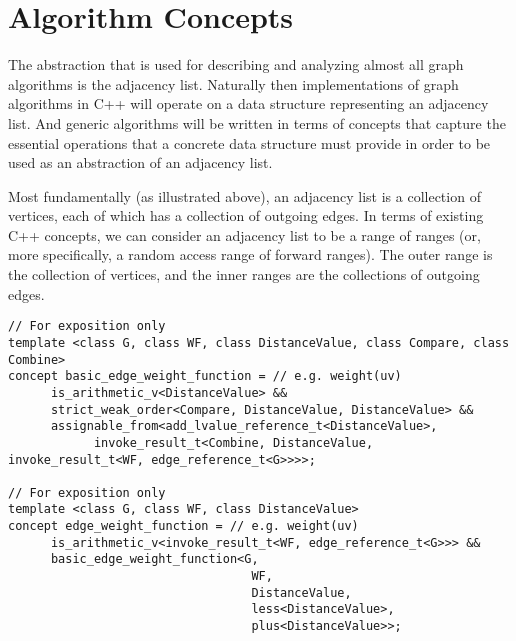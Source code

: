 

\clearpage
\section{Algorithm Concepts}


The abstraction that is used for describing and analyzing almost all graph algorithms is the adjacency list.  Naturally then implementations of graph algorithms in C++ will operate on a data structure representing an adjacency list.  And generic algorithms will be written in terms of concepts that capture the essential operations that a concrete data structure must provide in order to be used as an abstraction of an adjacency list.

Most fundamentally (as illustrated above), an adjacency list is a collection of vertices, each of which has a collection of outgoing edges.  In terms of existing C++ concepts, we can consider an adjacency list to be a range of ranges (or, more specifically, a random access range of forward ranges).  The outer range is the collection of vertices, and the inner ranges are the collections of outgoing edges.



\begin{lstlisting}
// For exposition only
template <class G, class WF, class DistanceValue, class Compare, class Combine>
concept basic_edge_weight_function = // e.g. weight(uv)
      is_arithmetic_v<DistanceValue> && 
      strict_weak_order<Compare, DistanceValue, DistanceValue> &&
      assignable_from<add_lvalue_reference_t<DistanceValue>,
            invoke_result_t<Combine, DistanceValue, invoke_result_t<WF, edge_reference_t<G>>>>;

// For exposition only
template <class G, class WF, class DistanceValue>
concept edge_weight_function = // e.g. weight(uv)
      is_arithmetic_v<invoke_result_t<WF, edge_reference_t<G>>> &&
      basic_edge_weight_function<G,
                                  WF,
                                  DistanceValue,
                                  less<DistanceValue>,
                                  plus<DistanceValue>>;
\end{lstlisting}

